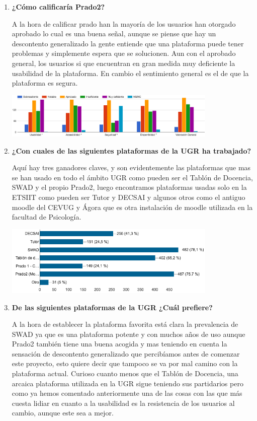 \begin{enumerate}
\begin{figure}[H]
\end{figure}

  \item \textbf{¿Cómo calificaría Prado2?}


A la hora de calificar prado han la mayoría de los usuarios han otorgado aprobado lo cual es una buena señal, aunque se piense que hay un descontento generalizado la gente entiende que una plataforma puede tener problemas y simplemente espera que se solucionen. Aun con el aprobado general, los usuarios si que encuentran en gran medida muy deficiente la usabilidad de la plataforma. En cambio el sentimiento general es el de que la plataforma es segura.

\includegraphics[width=0.8\textwidth]{../charts/06_calificaria}


  \item \textbf{¿Con cuales de las siguientes plataformas de la UGR ha trabajado?}

Aquí hay tres ganadores claves, y son evidentemente las plataformas que mas se han usado en todo el ámbito UGR como pueden ser el Tablón de Docencia, SWAD y el propio Prado2, luego encontramos plataformas usadas solo en la ETSIIT como pueden ser Tutor y DECSAI y algunos otros como el antiguo moodle del CEVUG y Ágora que es otra instalación de moodle utilizada en la facultad de Psicología.

\includegraphics[width=0.8\textwidth]{../charts/07_plataformastrabajado}

  \item \textbf{De las siguientes plataformas de la UGR ¿Cuál prefiere?}

A la hora de establecer la plataforma favorita está clara la prevalencia de SWAD ya que es una plataforma potente y con muchos años de uso aunque Prado2 también tiene una buena acogida y mas teniendo en cuenta la sensación de descontento generalizado que percibíamos antes de comenzar este proyecto, esto quiere decir que tampoco se va por mal camino con la plataforma actual. Curioso cuanto menos que el Tablón de Docencia, una arcaica plataforma utilizada en la UGR sigue teniendo sus partidarios pero como ya hemos comentado anteriormente una de las cosas con las que más cuesta lidiar en cuanto a la usabilidad es la resistencia de los usuarios al cambio, aunque este sea a mejor.


\end{enumerate}
